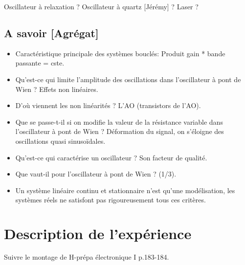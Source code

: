 \documentclass[11pt]{report}
\numberwithin{figure}{section}
\numberwithin{equation}{section}
\numberwithin{table}{section}
\newcommand{\1}{\boldsymbol{1}}
\begin{document}
Oscillateur à relaxation ? Oscillateur à quartz [Jérémy] ?
Laser ?


\subsection*{A savoir [Agrégat]}
\begin{itemize}
\item Caractéristique principale des systèmes bouclés: Produit gain * bande passante = cste.
\item Qu’est-ce qui limite l’amplitude des oscillations dans l’oscillateur à pont
de Wien ? Effets non linéaires.
\item D’où viennent les non linéarités ? L’AO (transistors de l’AO).
\item Que se passe-t-il si on modifie la valeur de la résistance variable dans l’oscillateur à pont de
Wien ? Déformation du signal, on s’éloigne des oscillations quasi sinusoïdales.
\item Qu’est-ce qui
caractérise un oscillateur ? Son facteur de qualité.
\item Que vaut-il pour l’oscillateur à pont de Wien ? (1/3).
\item Un système linéaire continu et stationnaire n’est qu’une modélisation, les systèmes réels ne satisfont pas rigoureusement tous ces critères.
\end{itemize}


\section*{Description de l'expérience}


\textcolor{mycolor5}{Suivre le montage de H-prépa électronique I p.183-184.}
\end{document}

